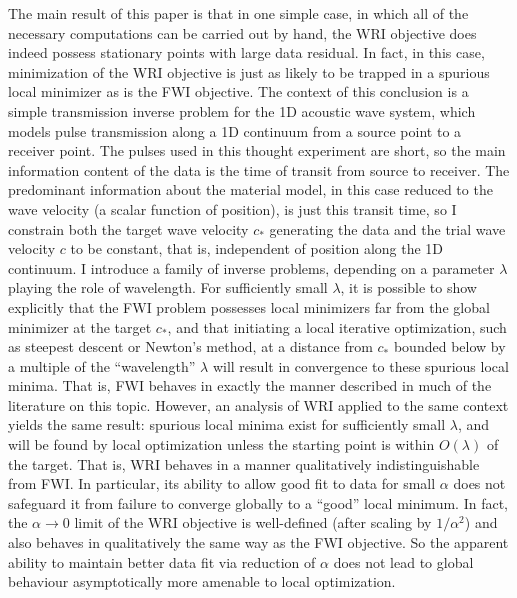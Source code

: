 The main result of this paper is that in one simple case, in which all
of the necessary computations can be carried out by hand, the WRI
objective does indeed possess stationary points with large data residual.
In fact, in this case, minimization of the WRI objective is just as likely to
be trapped in a spurious local minimizer as is the FWI objective.  The
context of this conclusion is a simple transmission inverse problem
for the 1D acoustic wave system, which models pulse transmission along
a 1D continuum from a source point to a receiver point. The pulses
used in this thought experiment are short, so the main information
content of the data is the time of transit from source to
receiver. The predominant information about the material model, in
this case reduced to the wave velocity (a scalar function of
position), is just this transit time, so I constrain both the target
wave velocity $c_*$ generating the data and the trial wave velocity
$c$ to be constant, that is, independent of position along the 1D
continuum. I introduce a family of inverse problems, depending on a
parameter $\lambda$ playing the role of wavelength. For sufficiently small
$\lambda$, it is possible to show explicitly that the FWI problem
possesses local minimizers far from the global minimizer at the target
$c_*$, and that initiating a local iterative optimization, such as
steepest descent or Newton's method, at a distance from $c_*$ bounded
below by a multiple of the ``wavelength'' $\lambda$ will result in
convergence to these spurious local minima. That is, FWI 
behaves in exactly the manner described in much of the literature on
this topic. However, an analysis of WRI applied to the same context
yields the same result: spurious local minima exist for sufficiently
small $\lambda$, and will be found by local optimization unless the
starting point is within $O(\lambda)$ of the target. That is, WRI
behaves in a manner qualitatively indistinguishable from FWI. In
particular, its ability to allow good fit to data for small $\alpha$
does not safeguard it from failure to converge globally to a ``good''
local minimum. In fact, the $\alpha \rightarrow 0$ limit of the WRI
objective is well-defined (after scaling by $1/\alpha^2$) and also behaves in
qualitatively the same way as the FWI objective. So the apparent
ability to maintain better data fit via reduction of $\alpha$ does not
lead to global behaviour asymptotically more amenable to local
optimization.

